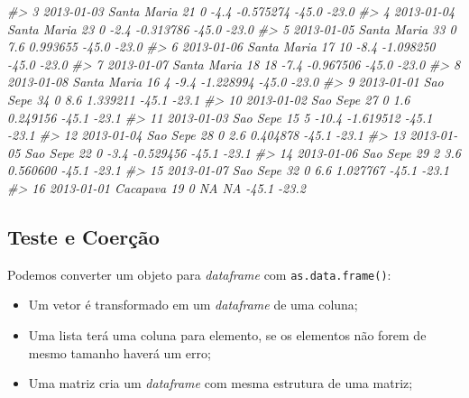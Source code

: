 \documentclass[]{book}
\newenvironment{Shaded}{\begin{snugshade}}{\end{snugshade}}
\newcommand{\CommentTok}[1]{\textcolor[rgb]{0.56,0.35,0.01}{\textit{#1}}}
\begin{document}
\begin{Shaded}
\begin{Highlighting}[]
\CommentTok{#> 3  2013-01-03 Santa Maria  21    0      -4.4      -0.575274 -45.0 -23.0}
\CommentTok{#> 4  2013-01-04 Santa Maria  23    0      -2.4      -0.313786 -45.0 -23.0}
\CommentTok{#> 5  2013-01-05 Santa Maria  33    0       7.6       0.993655 -45.0 -23.0}
\CommentTok{#> 6  2013-01-06 Santa Maria  17   10      -8.4      -1.098250 -45.0 -23.0}
\CommentTok{#> 7  2013-01-07 Santa Maria  18   18      -7.4      -0.967506 -45.0 -23.0}
\CommentTok{#> 8  2013-01-08 Santa Maria  16    4      -9.4      -1.228994 -45.0 -23.0}
\CommentTok{#> 9  2013-01-01    Sao Sepe  34    0       8.6       1.339211 -45.1 -23.1}
\CommentTok{#> 10 2013-01-02    Sao Sepe  27    0       1.6       0.249156 -45.1 -23.1}
\CommentTok{#> 11 2013-01-03    Sao Sepe  15    5     -10.4      -1.619512 -45.1 -23.1}
\CommentTok{#> 12 2013-01-04    Sao Sepe  28    0       2.6       0.404878 -45.1 -23.1}
\CommentTok{#> 13 2013-01-05    Sao Sepe  22    0      -3.4      -0.529456 -45.1 -23.1}
\CommentTok{#> 14 2013-01-06    Sao Sepe  29    2       3.6       0.560600 -45.1 -23.1}
\CommentTok{#> 15 2013-01-07    Sao Sepe  32    0       6.6       1.027767 -45.1 -23.1}
\CommentTok{#> 16 2013-01-01    Cacapava  19    0        NA             NA -45.1 -23.2}
\end{Highlighting}
\end{Shaded}

\subsection{Teste e Coerção}\label{teste-e-coercao}

Podemos converter um objeto para \emph{dataframe} com
\texttt{as.data.frame()}:

\begin{itemize}
\item
  Um vetor é transformado em um \emph{dataframe} de uma coluna;
\item
  Uma lista terá uma coluna para elemento, se os elementos não forem de
  mesmo tamanho haverá um erro;
\item
  Uma matriz cria um \emph{dataframe} com mesma estrutura de uma matriz;
\end{itemize}
\end{document}
